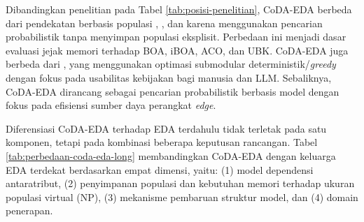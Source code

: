 Dibandingkan penelitian pada Tabel \ref{tab:posisi-penelitian}, CoDA-EDA berbeda dari pendekatan berbasis populasi \textcite{gaspar-cunha_evolutionary_2015}, \textcite{shang_abac_2024}, dan \textcite{li_attribute_2026} karena menggunakan pencarian probabilistik tanpa menyimpan populasi eksplisit. 
Perbedaan ini menjadi dasar evaluasi jejak memori terhadap BOA, iBOA, ACO, dan UBK. 
CoDA-EDA juga berbeda dari \textcite{guo_--fly_2025}, yang menggunakan optimasi submodular deterministik/\textit{greedy} dengan fokus pada usabilitas kebijakan bagi manusia dan LLM. 
Sebaliknya, CoDA-EDA dirancang sebagai pencarian probabilistik berbasis model dengan fokus pada efisiensi sumber daya perangkat \textit{edge}.

Diferensiasi CoDA-EDA terhadap EDA terdahulu tidak terletak pada satu komponen, tetapi pada kombinasi beberapa keputusan rancangan. 
Tabel \ref{tab:perbedaan-coda-eda-long} membandingkan CoDA-EDA dengan keluarga EDA terdekat berdasarkan empat dimensi, yaitu: (1) model dependensi antaratribut, (2) penyimpanan populasi dan kebutuhan memori terhadap ukuran populasi virtual (NP), (3) mekanisme pembaruan struktur model, dan (4) domain penerapan.

